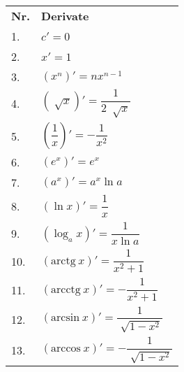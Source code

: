 \documentclass{article}
\begin{document}
\setlength{\extrarowheight}{10pt}

\begin{table}[!ht]
  \begin{minipage}{0.5\linewidth}
    \centering
    \begin{tabular}{ll}

      \textbf{Nr.} & \textbf{Derivate}                                               \\

      1.           & $c' = 0$                                                        \\

      2.           & $x' = 1$                                                        \\

      3.           & $\left(x^n\right)' = nx^{n-1}$                                  \\

      4.           & $\left(\sqrt[]{x}\right)' = \dfrac{1}{2\ \sqrt[]{x}}$           \\

      5.           & $\left(\dfrac{1}{x}\right)' = -\dfrac{1}{x^2}$                  \\

      6.           & $\left(e^x\right)' = e^x$                                       \\

      7.           & $\left(a^x\right)' = a^x \ln a$                                 \\

      8.           & $\left(\ln x\right)' = \dfrac{1}{x}$                            \\

      9.           & $\left(\log_a x\right)' = \dfrac{1}{x\ln a}$                    \\

      10.          & $\left(\text{arctg}\ x\right)' = \dfrac{1}{x^2+1}$              \\

      11.          & $\left(\text{arcctg}\ x\right)' = -\dfrac{1}{x^2+1}$            \\

      12.          & $\left(\text{arcsin}\ x\right)' = \dfrac{1}{\sqrt[]{1-x^2}}$    \\

      13.          & $\left(\text{arccos}\ x\right)' = -\dfrac{1}{\sqrt[]{1-x^2}}$   \\


\end{tabular}
\end{minipage}
\end{table}
\end{document}
